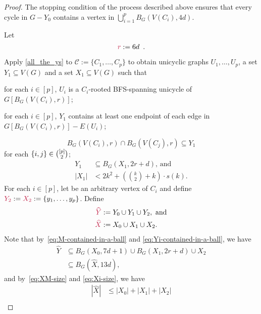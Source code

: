 \documentclass{patmorin}
\DeclarePairedDelimiter\set{\{}{\}}
\begin{document}
\begin{proof}
  The stopping condition of the process described above ensures that
  every cycle in $G-Y_0$ contains a vertex in $\bigcup_{i=1}^p B_G(V(C_i),4d)$.

  Let
  \[
    \mathdefin{r}:=6d\enspace .
  \]

  Apply \cref{all_the_ys} to $\mathcal{C}:=\{C_1,\ldots,C_p\}$ to obtain unicyclic graphs $U_1,\ldots,U_p$, a set $Y_1\subseteq V(G)$ and a set $X_1\subseteq V(G)$ such that
  \begin{tightenum}
    \item for each $i\in[p]$, $U_i$ is a  $C_i$-rooted BFS-spanning unicycle of $G[B_G(V(C_i),r)]$;
    \item for each $i\in[p]$, $Y_1$ contains at least one endpoint of each edge in $G[B_G(V(C_i),r)]- E(U_i)$;
  \end{tightenum}
  \begin{equation}
    B_{G}(V(C_i),r)\cap B_{G}(V(C_j),r)\subseteq Y_1
  \end{equation}
  for each $\set{i,j}\in\binom{[p]}{2}$;
  \begin{align}
    Y_1 & \subseteq B_G(X_1,2r+d)\text{, and} \label{eq:Yi-contained-in-a-ball}\\
    |X_1| & < \textstyle  2k^2+ (\binom{k}{2}+k)\cdot s(k). \label{eq:Xi-size}
  \end{align}
  For each $i\in[p]$, let  be an arbitrary vertex of $C_i$ and define $\mathdefin{Y_2}:=\mathdefin{X_2}:=\{y_1,\ldots,y_p\}$. Define
  \begin{align*}
    \mathdefin{\widehat{Y}}&:= \textstyle Y_0 \cup Y_1 \cup Y_2,\ \textrm{and}\\
    \mathdefin{\widehat{X}}&:=\textstyle X_0\cup X_1\cup X_2.
  \end{align*}
  Note that by~\eqref{eq:M-contained-in-a-ball} and \eqref{eq:Yi-contained-in-a-ball}, we have
  \begin{equation}\label{m_in_x_ball}
    \begin{split}
      \widehat{Y} & \textstyle\subseteq B_G(X_0,7d+1) \cup B_G(X_1,2r+d) \cup X_2\\
      & \subseteq B_G(\widehat{X}, 13d),
    \end{split}
  \end{equation}
  and by~\eqref{eq:XM-size} and \eqref{eq:Xi-size},  we have
  \begin{equation}
    \begin{split}
    |\widehat{X}|& \textstyle \leq |X_0| + |X_1| + |X_2|  \\

\end{split}
\end{equation}
\end{proof}
\end{document}
